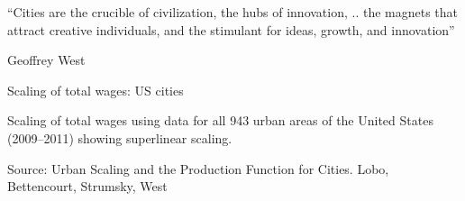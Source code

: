 \documentclass[]{beamer} %
\begin{document}
\begin{frame}{}
\color{black!35!blue}

    \Large 
    ``Cities are the crucible of civilization, the hubs of innovation, .. the magnets that attract creative individuals, and the stimulant for ideas, growth, and innovation''

    \vspace{-0.01cm}
    \hfill Geoffrey West

\end{frame}


\begin{frame}{Scaling of total wages: US cities}

\vspace{-.3cm}
\small Scaling of total wages using data for all 943 urban areas of the United States (2009–2011) showing superlinear scaling.

\vspace{.1cm}
\tiny Source: Urban Scaling and the Production Function for Cities. Lobo, Bettencourt, Strumsky, West
\end{frame}


\end{document}
